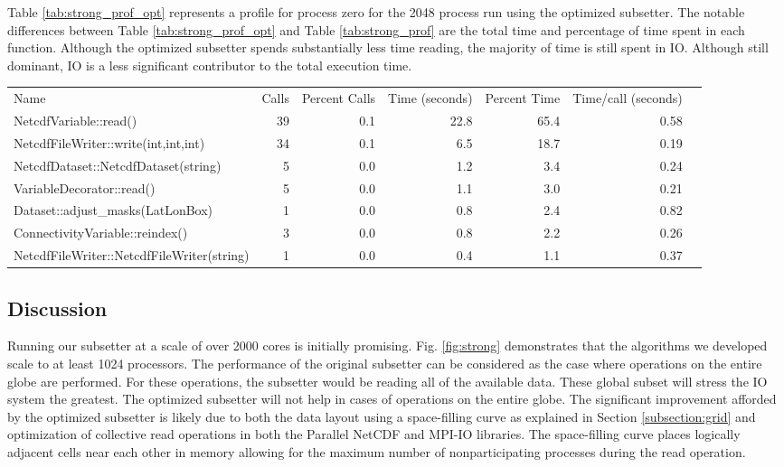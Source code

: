 Table \ref{tab:strong_prof_opt} represents a profile for process zero for
the 2048 process run using the optimized subsetter.  The notable differences
between Table \ref{tab:strong_prof_opt} and Table \ref{tab:strong_prof} are
the total time and percentage of time spent in each function.  Although the
optimized subsetter spends substantially less time reading, the majority of
time is still spent in IO.  Although still dominant, IO is a less significant
contributor to the total execution time.

\begin{table*}[!t]
\center
\caption{Partial Profile for Process 0 at 2048 Cores - MJO Region - Optimized}
\label{tab:strong_prof_opt}
\begin{tabular}{lrrrrrr}
Name&Calls&Percent Calls&Time (seconds)&Percent Time&Time/call (seconds)\\
NetcdfVariable::read()                    & 39&0.1&22.8&65.4&0.58\\
NetcdfFileWriter::write(int,int,int)      & 34&0.1& 6.5&18.7&0.19\\
NetcdfDataset::NetcdfDataset(string)      &  5&0.0& 1.2& 3.4&0.24\\
VariableDecorator::read()                 &  5&0.0& 1.1& 3.0&0.21\\
Dataset::adjust\_masks(LatLonBox)         &  1&0.0& 0.8& 2.4&0.82\\
ConnectivityVariable::reindex()           &  3&0.0& 0.8& 2.2&0.26\\
NetcdfFileWriter::NetcdfFileWriter(string)&  1&0.0& 0.4& 1.1&0.37\\
\end{tabular}
\end{table*}

\subsection{Discussion}

Running our subsetter at a scale of over 2000 cores is initially promising.
Fig. \ref{fig:strong} demonstrates that the algorithms we developed scale
to at least 1024 processors.  The performance of the original subsetter
can be considered as the case where operations on the entire globe are
performed. For these operations, the subsetter would be reading
all of the available data.  These global subset will stress the IO system
the greatest.  The optimized subsetter will not help in cases of operations on
the entire globe.  The significant improvement
afforded by the optimized subsetter is likely due to both the data layout using a
space-filling curve as explained in Section \ref{subsection:grid} and
optimization of collective read operations in both the Parallel NetCDF and
MPI-IO libraries.  The
space-filling curve places logically adjacent cells near each other in memory
allowing for the maximum number of nonparticipating processes during the read
operation.

